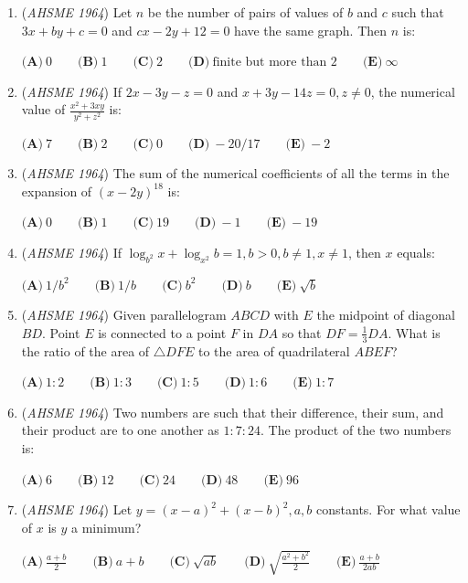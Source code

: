 \begin{enumerate}
	\item (\textit{AHSME 1964}) Let $n$ be the number of pairs of values of $b$ and $c$ such that $3x+by+c=0$ and $cx-2y+12=0$ have the same graph. Then $n$ is:


 $\textbf{(A)}\ 0\qquad \textbf{(B)}\ 1\qquad \textbf{(C)}\ 2\qquad \textbf{(D)}\ \text{finite but more than 2}\qquad \textbf{(E)}\ \infty$


	\item (\textit{AHSME 1964}) If $2x-3y-z=0$ and $x+3y-14z=0, z \neq 0$, the numerical value of $\frac{x^2+3xy}{y^2+z^2}$ is:


 $\textbf{(A)}\ 7\qquad \textbf{(B)}\ 2\qquad \textbf{(C)}\ 0\qquad \textbf{(D)}\ -20/17\qquad \textbf{(E)}\ -2$


	\item (\textit{AHSME 1964}) The sum of the numerical coefficients of all the terms in the expansion of $(x-2y)^{18}$ is:


 $\textbf{(A)}\ 0\qquad \textbf{(B)}\ 1\qquad \textbf{(C)}\ 19\qquad \textbf{(D)}\ -1\qquad \textbf{(E)}\ -19$


	\item (\textit{AHSME 1964}) If $\log_{b^2}x+\log_{x^2}b=1, b>0, b \neq 1, x \neq 1$, then $x$ equals:


 $\textbf{(A)}\ 1/b^2 \qquad \textbf{(B)}\ 1/b \qquad \textbf{(C)}\ b^2 \qquad \textbf{(D)}\ b \qquad \textbf{(E)}\ \sqrt{b}$


	\item (\textit{AHSME 1964}) Given parallelogram $ABCD$ with $E$ the midpoint of diagonal $BD$. Point $E$ is connected to a point $F$ in $DA$ so that 
$DF=\frac{1}{3}DA$. What is the ratio of the area of $\triangle DFE$ to the area of quadrilateral $ABEF$?


 $\textbf{(A)}\ 1:2 \qquad \textbf{(B)}\ 1:3 \qquad \textbf{(C)}\ 1:5 \qquad \textbf{(D)}\ 1:6 \qquad \textbf{(E)}\ 1:7$


	\item (\textit{AHSME 1964}) Two numbers are such that their difference, their sum, and their product are to one another as $1:7:24$. The product of the two numbers is:


 $\textbf{(A)}\ 6\qquad \textbf{(B)}\ 12\qquad \textbf{(C)}\ 24\qquad \textbf{(D)}\ 48\qquad \textbf{(E)}\ 96$


	\item (\textit{AHSME 1964}) Let $y=(x-a)^2+(x-b)^2, a, b$ constants. For what value of $x$ is $y$ a minimum?


 $\textbf{(A)}\ \frac{a+b}{2} \qquad \textbf{(B)}\ a+b \qquad \textbf{(C)}\ \sqrt{ab} \qquad \textbf{(D)}\ \sqrt{\frac{a^2+b^2}{2}}\qquad \textbf{(E)}\ \frac{a+b}{2ab}$



\end{enumerate}
